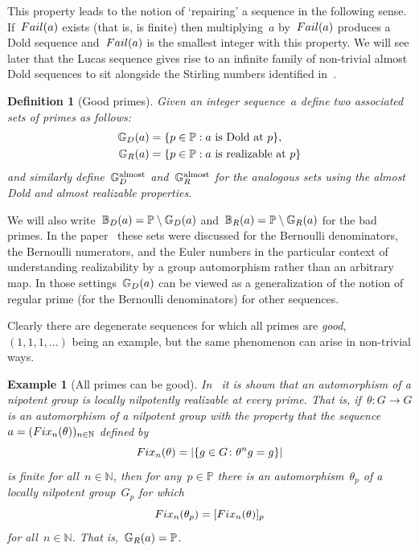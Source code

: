 \documentclass[10pt,a4paper]{amsart}
\numberwithin{equation}{section} %
\newtheorem{example}[thm]{Example}
\newtheorem{definition}[thm]{Definition}
\numberwithin{table}{section} %
\numberwithin{figure}{section}
\def\NN{\mathbb{N}}
\def\PP{\mathbb{P}}
\def\gooddoldprimes{\mathbb{G}_{\rm{D}}}
\def\baddoldprimes{\mathbb{B}_{\rm{D}}}
\def\goodrealizableprimes{\mathbb{G}_{\rm{R}}}
\def\badrealizableprimes{\mathbb{B}_{\rm{R}}}
\newcommand\failure{{\rm{Fail}}}
\newcommand\fix{{\rm{Fix}}}
\begin{document}
This property leads to the notion of `repairing' a sequence
in the following sense. If~$\failure(a)$ exists (that is, is finite)
then multiplying~$a$ by~$\failure(a)$ produces a Dold sequence
and~$\failure(a)$ is the smallest integer with this property.
We will see later that the Lucas sequence gives rise
to an infinite family of non-trivial almost Dold sequences
to sit alongside the Stirling numbers identified in~\cite{MR4361581}.

\begin{definition}[Good primes]
Given an integer sequence~$a$ define two
associated sets of
primes as follows:
\begin{align*}
\gooddoldprimes(a)
&=
\{p\in\PP :
a\mbox{ is Dold at }p\},\\
\goodrealizableprimes(a)
&=
\{p\in\PP :
a\mbox{ is realizable at }p\}
\end{align*}
and similarly define~$\gooddoldprimes^{\text{almost}}$ and~$\goodrealizableprimes^{\text{almost}}$
for the analogous sets using the almost Dold and almost realizable
properties.
\end{definition}

We will also write~$\baddoldprimes(a)=\PP\setminus\gooddoldprimes(a)$
and~$\badrealizableprimes(a)=\PP\setminus\goodrealizableprimes(a)$
for the bad primes.
In the paper~\cite{MR5076929} these sets were discussed
for the Bernoulli denominators, the Bernoulli
numerators, and the Euler numbers in the particular
context of understanding realizability by a group
automorphism rather than an arbitrary map.
In those settings~$\gooddoldprimes(a)$ can be
viewed as a generalization of the notion of
regular prime (for the Bernoulli denominators)
for other sequences.

Clearly there are degenerate sequences for which all
primes are \emph{good},~$(1,1,1,\dots)$ being an example,
but the same phenomenon can arise in non-trivial ways.

\begin{example}[All primes can be good]
In~{\rm{\cite[Th.~4]{MR5076929}}} it is shown that an automorphism of
a nipotent group is locally nilpotently realizable at every
prime. That is, if~$\theta\colon G\to G$ is an automorphism
of a nilpotent group with the property that the
sequence~$a=(\fix_n(\theta))_{n\in\NN}$ defined by
\[
\fix_n(\theta)
=
\vert\{g\in G\colon\theta^ng=g\}\vert
\]
is finite for all~$n\in\NN$, then for any~$p\in\PP$
there is an automorphism~$\theta_p$ of a locally
nilpotent group~$G_p$ for which
\[
\fix_n(\theta_p)=[\fix_n(\theta)]_p
\]
for all~$n\in\NN$. That is,~$\goodrealizableprimes(a)=\PP$.
\end{example}
\end{document}
